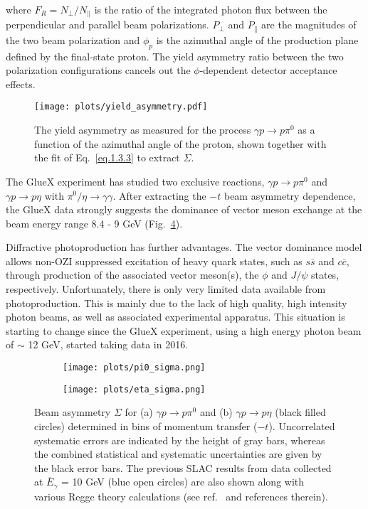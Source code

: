 \noindent where $F_{R} = N_{\perp}/N_{\parallel}$ is the ratio of the integrated photon flux between the perpendicular and parallel beam polarizations. $P_{\perp}$ and $P_{\parallel}$ are the magnitudes of the two beam polarization and $\phi_{p}$ is the azimuthal angle of the production plane defined by the final-state proton. The yield asymmetry ratio between the two polarization configurations cancels out the $\phi$-dependent detector acceptance effects.

\begin{figure}[H]
    \centering
        \texttt{[image: plots/yield\_asymmetry.pdf]}
        \caption{The yield asymmetry as measured for the process $\gamma p \rightarrow p \pi^{0}$ as a function of the azimuthal angle of the proton, shown together with the fit of Eq.~\ref{eq.1.3.3} to extract $\Sigma$.}
    \label{fig.1.3.3.2}
\end{figure}

The GlueX experiment has studied two exclusive reactions, $\gamma p \rightarrow p \pi^{0}$ and $\gamma p \rightarrow p \eta$ with $\pi^{0}/\eta\rightarrow \gamma\gamma$. After extracting the $-t$ beam asymmetry dependence, the GlueX data strongly suggests the dominance of vector meson exchange at the beam energy range 8.4 - 9 GeV (Fig.~\ref{fig.1.3.3.3}).
~\par Diffractive photoproduction has further advantages. The vector dominance model allows non-OZI suppressed excitation of heavy quark states, such as $s\bar{s}$ and $c\bar{c}$, through production of the associated vector meson(s), the $\phi$ and $J/\psi$ states, respectively. Unfortunately, there is only very limited data available from photoproduction. This is mainly due to the lack of high quality, high intensity photon beams, as well as associated experimental apparatus. This situation is starting to change since the GlueX experiment, using a high energy photon beam of $\sim$ 12 GeV, started taking data in 2016.

\begin{figure}[H]
    \centering
    \begin{subfigure}[b]{0.65\textwidth}
        \texttt{[image: plots/pi0\_sigma.png]}
        \caption{}
        \label{fig.1.3.3.3.a}
    \end{subfigure}\hfill
    \begin{subfigure}[b]{0.65\textwidth}
        \texttt{[image: plots/eta\_sigma.png]}
        \caption{}
        \label{fig.1.3.3.3.b}
    \end{subfigure}
    \caption{ Beam asymmetry $\Sigma$ for (a) $\gamma p \rightarrow p \pi^{0}$ and (b) $\gamma p \rightarrow p \eta$ (black filled circles) determined in bins of momentum transfer ($-t$). Uncorrelated systematic errors are indicated by the height of gray bars, whereas the combined statistical and systematic uncertainties are given by the black error bars. The previous SLAC results from data collected at $\overline{{E}}_{\gamma}$ = 10 GeV (blue open circles) are also shown along with various Regge theory calculations (see ref.~\cite{Ghoul17} and references therein).}
    \label{fig.1.3.3.3}
\end{figure}

